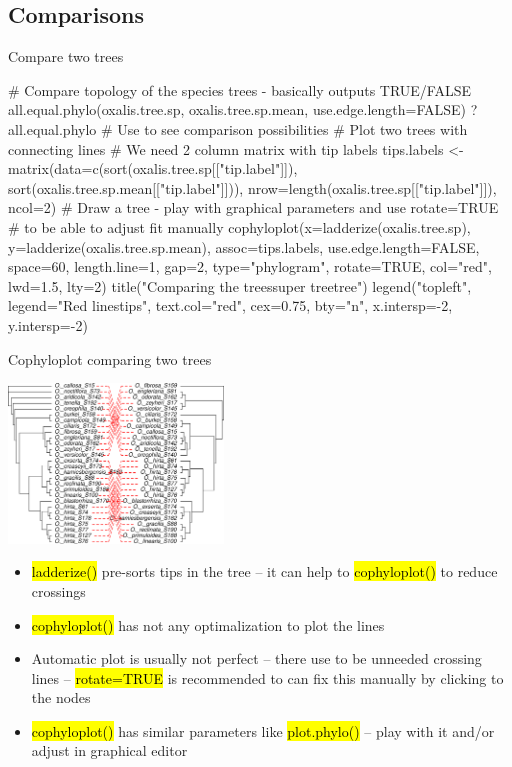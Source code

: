 \documentclass[compress, ucs, xelatex, 11pt, xcolor=svgnames,
  hyperref={
    bookmarks=true,
    unicode=true,
    colorlinks=true,
    pdftitle={Molecular data in R},
    plainpages=false,
    pdfauthor={Vojtech Zeisek},
    pdfsubject={Course about phylogeny and evolution in R},
    pdfcreator={XeLaTeX},
    pdfkeywords={R, evolution, phylogeny, molecular data},
    linkcolor=Tomato,
    anchorcolor=SaddleBrown,
    citecolor=Goldenrod,
    filecolor=DarkMagenta,
    menucolor=Sienna,
    urlcolor=DarkTurquoise,
    pdftex},
  url={hyphens, lowtilde} %
  ]{beamer}
\renewcommand{\texttt}[1]{\hl{\ttfamily #1}}
\begin{document}
\subsection{Comparisons}

\begin{frame}[fragile]{Compare two trees}
  \begin{spluscode}
    # Compare topology of the species trees - basically outputs TRUE/FALSE
    all.equal.phylo(oxalis.tree.sp, oxalis.tree.sp.mean,
      use.edge.length=FALSE)
    ?all.equal.phylo # Use to see comparison possibilities
    # Plot two trees with connecting lines
    # We need 2 column matrix with tip labels
    tips.labels <- matrix(data=c(sort(oxalis.tree.sp[["tip.label"]]),
      sort(oxalis.tree.sp.mean[["tip.label"]])),
      nrow=length(oxalis.tree.sp[["tip.label"]]), ncol=2)
    # Draw a tree - play with graphical parameters and use rotate=TRUE
    # to be able to adjust fit manually
    cophyloplot(x=ladderize(oxalis.tree.sp),
      y=ladderize(oxalis.tree.sp.mean),  assoc=tips.labels,
      use.edge.length=FALSE, space=60, length.line=1, gap=2,
      type="phylogram", rotate=TRUE, col="red", lwd=1.5, lty=2)
    title("Comparing the trees\nParsimony super tree\tSpecies tree")
    legend("topleft", legend="Red lines\nconnect tips", text.col="red",
      cex=0.75, bty="n", x.intersp=-2, y.intersp=-2)
  \end{spluscode}
\end{frame}

\begin{frame}{Cophyloplot comparing two trees}
  \begin{multicols}{2}
    \begin{center}
      \includegraphics[height=4.25cm]{cophyloplot.png}
    \end{center}
    \begin{itemize}
      \item \texttt{ladderize()} pre-sorts tips in the tree -- it can help to \texttt{cophyloplot()} to reduce crossings
      \item \texttt{cophyloplot()} has not any optimalization to plot the lines
      \item Automatic plot is usually not perfect -- there use to be unneeded crossing lines -- \texttt{rotate=TRUE} is recommended to can fix this manually by clicking to the nodes
      \item \texttt{cophyloplot()} has similar parameters like \texttt{plot.phylo()} -- play with it and/or adjust in graphical editor
    \end{itemize}
  \end{multicols}
\end{frame}
\end{document}
